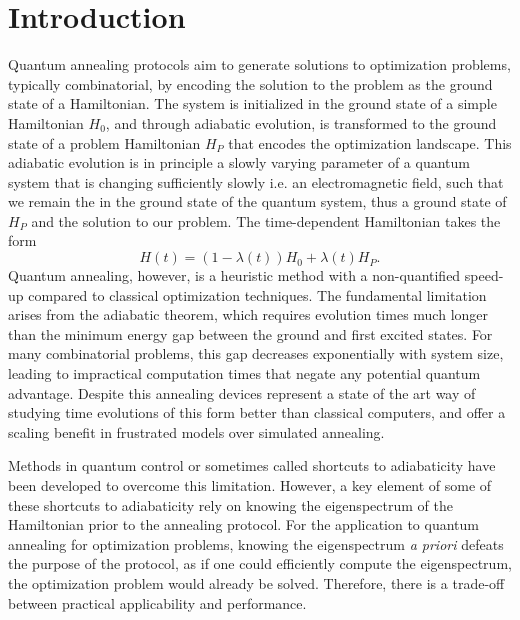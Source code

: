 \newpage
{}
\doublespacing
\chapter{Introduction}\label{sec:introduction}

\qquad Quantum annealing protocols aim to generate solutions to optimization problems, typically combinatorial, by encoding the solution to the problem as the ground state of a Hamiltonian. The system is initialized in the ground state of a simple Hamiltonian $H_0$, and through adiabatic evolution, is transformed to the ground state of a problem Hamiltonian $H_P$ that encodes the optimization landscape. This adiabatic evolution is in principle a slowly varying parameter of a quantum system that is changing sufficiently slowly i.e. an electromagnetic field, such that we remain the in the ground state of the quantum system, thus a ground state of $H_P$ and the solution to our problem.\cite{AlbashLidar2018} The time-dependent Hamiltonian takes the form
\begin{equation}\label{eq:annealing_hamiltonian}
    H(t) = (1-\lambda(t))H_0 + \lambda(t)H_P.
\end{equation}
\qquad Quantum annealing, however, is a heuristic method with a non-quantified speed-up compared to classical optimization techniques. The fundamental limitation arises from the adiabatic theorem, which requires evolution times much longer than the minimum energy gap between the ground and first excited states. For many combinatorial problems, this gap decreases exponentially with system size, leading to impractical computation times that negate any potential quantum advantage. Despite this annealing devices represent a state of the art way of studying time evolutions of this form better than classical computers,\cite{DWAVEBeyondClassical2025} and offer a scaling benefit in frustrated models over simulated annealing.\cite{AlbashQASpeedUp2018}

\qquad Methods in quantum control or sometimes called shortcuts to adiabaticity have been developed to overcome this limitation. However, a key element of some of these shortcuts to adiabaticity rely on knowing the eigenspectrum of the Hamiltonian prior to the annealing protocol. For the application to quantum annealing for optimization problems, knowing the eigenspectrum \textit{a priori} defeats the purpose of the protocol, as if one could efficiently compute the eigenspectrum, the optimization problem would already be solved. \cite{ControlReviewCampbell} Therefore, there is a trade-off between practical applicability and performance. 

